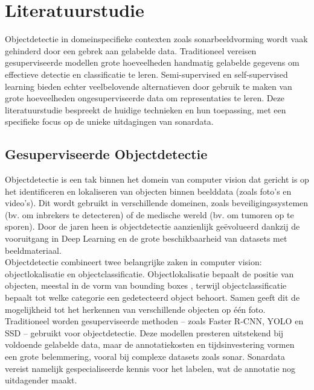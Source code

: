 
\section{Literatuurstudie}%
\label{sec:literatuurstudie}

Objectdetectie in domeinspecifieke contexten zoals sonarbeeldvorming wordt vaak gehinderd door een gebrek aan gelabelde data. Traditioneel vereisen gesuperviseerde modellen grote hoeveelheden handmatig gelabelde gegevens om effectieve detectie en classificatie te leren. Semi-supervised en self-supervised learning bieden echter veelbelovende alternatieven door gebruik te maken van grote hoeveelheden ongesuperviseerde data om representaties te leren. Deze literatuurstudie bespreekt de huidige technieken en hun toepassing, met een specifieke focus op de unieke uitdagingen van sonardata.

\subsection{Gesuperviseerde Objectdetectie}

Objectdetectie is een tak binnen het domein van computer vision dat gericht is op het identificeren en lokaliseren van objecten binnen beelddata (zoals foto's en video's). Dit wordt gebruikt in verschillende domeinen, zoals beveiligingssystemen (bv. om inbrekers te detecteren) of de medische wereld (bv. om tumoren op te sporen). Door de jaren heen is objectdetectie aanzienlijk geëvolueerd dankzij de vooruitgang in Deep Learning en de grote beschikbaarheid van datasets met beeldmateriaal. \autocite{He_2016} \\

Objectdetectie combineert twee belangrijke zaken in computer vision: objectlokalisatie en objectclassificatie. Objectlokalisatie bepaalt de positie van objecten, meestal in de vorm van bounding boxes \autocite{Tompson_2015}, terwijl objectclassificatie bepaalt tot welke categorie een gedetecteerd object behoort. Samen geeft dit de mogelijkheid tot het herkennen van verschillende objecten op één foto. \\

Traditioneel worden gesuperviseerde methoden -- zoals Faster R-CNN, YOLO en SSD -- gebruikt voor objectdetectie. \autocite{Redmon_2016} Deze modellen presteren uitstekend bij voldoende gelabelde data, maar de annotatiekosten en tijdsinvestering vormen een grote belemmering, vooral bij complexe datasets zoals sonar. Sonardata vereist namelijk gespecialiseerde kennis voor het labelen, wat de annotatie nog uitdagender maakt. \autocite{Long_2015}

